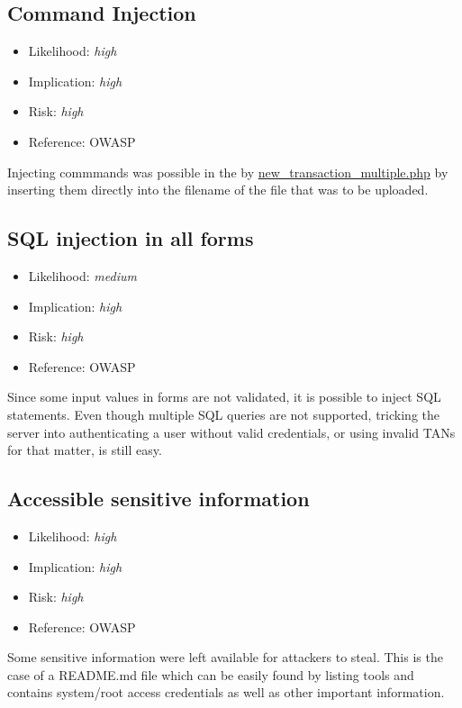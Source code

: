 \subsection{Command Injection} \label{over:command_injection}
\begin{itemize}
	\item Likelihood: \textit{high}
	\item Implication: \textit{high}
	\item Risk: \textit{high}
	\item Reference: OWASP 
\end{itemize}
Injecting commmands was possible in the by \url{new\_transaction\_multiple.php} by inserting them directly into the filename of the file that was to be uploaded.

\subsection{SQL injection in all forms} \label{over:sqlgnb}
\begin{itemize}
	\item Likelihood: \textit{medium}
	\item Implication: \textit{high}
	\item Risk: \textit{high}
	\item Reference: OWASP 
\end{itemize}
Since some input values in forms are not validated, it is possible to inject SQL statements. Even though multiple SQL queries are not supported, tricking the server into authenticating a user without valid credentials, or using invalid TANs for that matter, is still easy.
\clearpage


\subsection{Accessible sensitive information} \label{over:configuration}
\begin{itemize}
	\item Likelihood: \textit{high}
	\item Implication: \textit{high}
	\item Risk: \textit{high}
	\item Reference: OWASP 
\end{itemize}
Some sensitive information were left available for attackers to steal. This is the case of a README.md file which can be easily found by listing tools and contains system/root access credentials as well as other important information.

